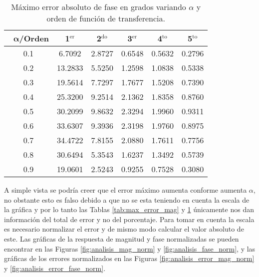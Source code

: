 	\begin{table}[!hbp]                                 
	\centering            
	\caption{Máximo error absoluto de fase en grados variando $\alpha$ y orden de función de transferencia.}                           
	\label{tab:max_error_fase}                               
		\begin{tabular}{cccccc}
			\hline                                             
			$\,\,\,\,\bm{\alpha}$\textbf{/Orden} & \textbf{1$^{\mathrm{er}}$} & \textbf{2$^{\mathrm{do}}$} & \textbf{3$^{\mathrm{er}}$} & \textbf{4$^{\mathrm{to}}$} & \textbf{5$^{\mathrm{to}}$} \\                     
			\hline                                             
			0.1 & 6.7092 & 2.8727 & 0.6548 & 0.5632 & 0.2796 \\ 
			                                             
			0.2 & 13.2833 & 5.5250 & 1.2598 & 1.0838 & 0.5338 \\
			                                            
			0.3 & 19.5614 & 7.7297 & 1.7677 & 1.5208 & 0.7390 \\
			                                              
			0.4 & 25.3200 & 9.2514 & 2.1362 & 1.8358 & 0.8760 \\
			                                            
			0.5 & 30.2099 & 9.8632 & 2.3294 & 1.9960 & 0.9311 \\
			                                             
			0.6 & 33.6307 & 9.3936 & 2.3198 & 1.9760 & 0.8975 \\
			                                             
			0.7 & 34.4722 & 7.8155 & 2.0880 & 1.7611 & 0.7756 \\
			                                             
			0.8 & 30.6494 & 5.3543 & 1.6237 & 1.3492 & 0.5739 \\
			                                             
			0.9 & 19.0601 & 2.5243 & 0.9255 & 0.7528 & 0.3080 \\
			\hline                                             
		\end{tabular}                                                             
	\end{table}

	A simple vista se podría creer que el error máximo aumenta conforme aumenta $\alpha$, no obstante esto es falso debido a que no se esta teniendo en cuenta la escala de la gráfica y por lo tanto las Tablas \ref{tab:max_error_mag} y \ref{tab:max_error_fase} únicamente nos dan información del total de error y no del porcentaje. Para tomar en cuenta la escala es necesario normalizar el error y de mismo modo calcular el valor absoluto de este. Las gráficas de la respuesta de magnitud y fase normalizadas se pueden encontrar en las Figuras \ref{fig:analisis_mag_norm} y \ref{fig:analisis_fase_norm}, y las gráficas de los errores normalizados en las Figuras \ref{fig:analisis_error_mag_norm} y \ref{fig:analisis_error_fase_norm}.
	
